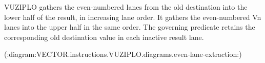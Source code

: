 VUZIPLO gathers the even-numbered lanes from the old destination into the lower
half of the result, in increasing lane order.  It gathers the even-numbered Vn
lanes into the upper half in the same order.  The governing predicate retains
the corresponding old destination value in each inactive result lane.

(:diagram:VECTOR.instructions.VUZIPLO.diagrams.even-lane-extraction:)
